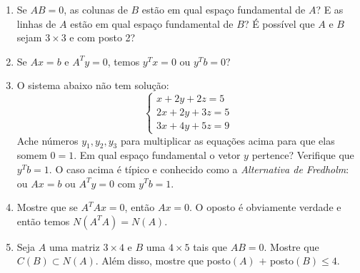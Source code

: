 \documentclass[leqno]{article}
\numberwithin{equation}{section}
\begin{document}
\begin{enumerate}

\item Se $AB = 0$, as colunas de $B$ estão em qual espaço fundamental de $A$? E as linhas de $A$ estão em qual espaço fundamental de $B$? É possível que $A$ e $B$ sejam $3 \times 3$ e com posto 2?

    \begin{sol}
        
    \end{sol}

\item Se $Ax = b$ e $A^Ty = 0$, temos $y^Tx = 0$ ou $y^Tb=0$?

    \begin{sol}
        
    \end{sol}

\item O sistema abaixo não tem solução:
$$\begin{cases}
x + 2y + 2z = 5\\
2x + 2y + 3z = 5\\
3x + 4y + 5z = 9
\end{cases}$$
Ache números $y_1,y_2,y_3$ para multiplicar as equações acima para que elas somem $0=1$. Em qual espaço fundamental o vetor $y$ pertence? Verifique que $y^Tb = 1$. O caso acima é típico e conhecido como a \textit{Alternativa de Fredholm}: ou $Ax = b$ ou $A^Ty = 0$ com $y^Tb = 1$.

    \begin{sol}
        
    \end{sol}

\item Mostre que se $A^TAx = 0$, então $Ax = 0$. O oposto é obviamente verdade e então temos $N(A^TA) = N(A)$.

    \begin{sol}
        
    \end{sol}

\item Seja $A$ uma matriz $3 \times 4$ e $B$ uma $4 \times 5$ tais que $AB = 0$. Mostre que $C(B) \subset N(A)$. Além disso, mostre que posto$(A)$ $ + $ posto$(B) \leq 4$.

    \begin{sol}
        
    \end{sol}


\end{enumerate}
\end{document}
